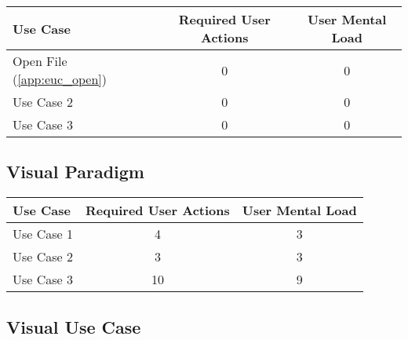 \begin{tabularx}{\textwidth}{Xcc}
\textbf{Use Case} & \textbf{Required User Actions} & \textbf{User Mental Load}\\
\hline
Open File (\ref{app:euc_open}) & 0 & 0 \\
Use Case 2                     & 0 & 0 \\
Use Case 3                     & 0 & 0
\end{tabularx}

\subsection*{Visual Paradigm}




\begin{tabularx}{\textwidth}{Xcc}
\textbf{Use Case} & \textbf{Required User Actions} & \textbf{User Mental Load}\\
\hline
Use Case 1                          & 4 & 3 \\
Use Case 2                          & 3 & 3 \\
Use Case 3                          & 10 & 9
\end{tabularx}

\subsection*{Visual Use Case}

